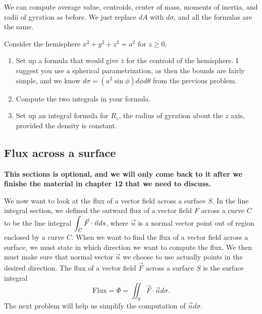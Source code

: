 We can compute average value, centroids, center of mass, moments of inertia, and radii of gyration as before.  We just replace $dA$ with $d\sigma$, and all the formulas are the same. 


\begin{problem}
 Consider the hemisphere $x^2+y^2+z^2=a^2$ for $z\geq 0$. 
\begin{enumerate}
 \item Set up a formula that would give $\bar z$ for the centroid of the hemisphere. I suggest you use a spherical parametrization, as then the bounds are fairly simple, and we know $d\sigma = (a^2\sin\phi) d\phi d\theta$ from the previous problem.
 \item Compute the two integrals in your formula. %
 \item Set up an integral formula for $R_z$, the radius of gyration about the $z$ axis, provided the density is constant.
\end{enumerate}
\end{problem}

\subsection{Flux across a surface}
\textbf{This sections is optional, and we will only come back to it after we finishe the material in chapter 12 that we need to discuss.}

We now want to look at the flux of a vector field across a surface $S$.  In the line integral section, we defined the outward flux of a vector field $F$ across a curve $C$ to be the line integral $\displaystyle \int_C \vec F\cdot \vec n ds$, where $\vec n$ is a normal vector point out of region enclosed by a curve $C$. When we want to find the flux of a vector field across a surface, we must state in which direction we want to compute the flux. We then must make sure that normal vector $\vec n$ we choose to use actually points in the desired direction. The flux of a vector field $\vec F$ across a surface $S$ is the surface integral
$$\text{Flux}=\Phi 
= \iint_S \vec F\cdot \vec n d\sigma 
.$$
The next problem will help us simplify the computation of $\vec nd\sigma$.

